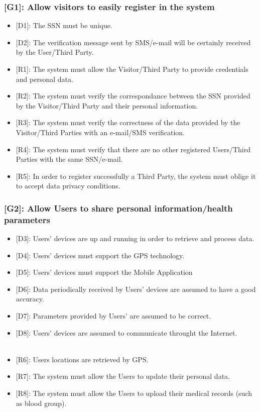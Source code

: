 \documentclass[12pt,a4paper]{article}
\begin{document}
	\subsubsection*{{[}{G1}{]}: Allow visitors to easily register in the system}
	\begin{itemize}
		\begin{itemize}
			\item {[D1]}: The SSN must be unique.
			\item {[D2]}: The verification message sent by SMS/e-mail will be certainly received by the User/Third Party.
			\\
			\item {[R1]}: The system must allow the Visitor/Third Party to provide credentials and personal data.
			\item {[R2]}: The system must verify the correspondance between the SSN provided by the Visitor/Third Party and their personal information.
			\item {[R3]}: The system must verify the correctness of the data provided by the Visitor/Third Parties with an e-mail/SMS verification.
			\item {[R4]}: The system must verify that there are no other registered Users/Third Parties with the same SSN/e-mail.
			\item {[R5]}: In order to register successfully a Third Party, the system must oblige it to accept data privacy conditions.
		\end{itemize} 
	\end{itemize}
	\subsubsection*{{[}{G2}{]}: Allow Users to share personal information/health parameters}
	\begin{itemize}
		\begin{itemize}
			\item {[D3]}: Users' devices are up and running in order to retrieve and process data.
			\item {[D4]}: Users' devices must support the GPS technology.
			\item {[D5]}: Users' devices must support the Mobile Application
			\item {[D6]}: Data periodically received by Users' devices are assumed to have a good accuracy. 
			\item {[D7]}: Parameters provided by Users' are assumed to be correct. 
			\item {[D8]}: Users' devices are assumed to communicate throught the Internet.
			\\\\
			\item {[R6]}: Users locations are retrieved by GPS.
			\item {[R7]}: The system must allow the Users to update their personal data.
			\item {[R8]}: The system must allow the Users to upload their medical records (such as blood group).
		\end{itemize} 
	\end{itemize}
\end{document}
